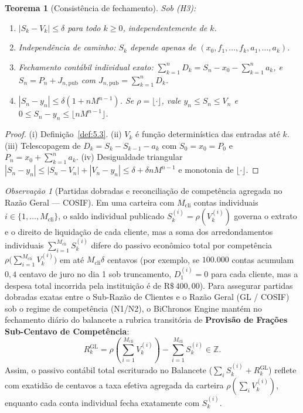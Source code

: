 \documentclass[11pt, a4paper]{article}
\theoremstyle{definition}
\theoremstyle{plain}
\newtheorem{teorema}[definicao]{Teorema}
\theoremstyle{remark}
\newtheorem{observacao}[definicao]{Observação}
\begin{document}
\begin{teorema}[Consistência de fechamento]\label{teo:5.8}
Sob (H3):
\begin{enumerate}[label=(\roman*)]
    \item $|S_k - V_k| \le \delta$ para todo $k \ge 0$, independentemente de $k$.
    \item Independência de caminho: $S_k$ depende apenas de $(x_0, f_1, \dots, f_k, a_1, \dots, a_k)$.
    \item Fechamento contábil individual exato: $\sum_{k=1}^{n} D_k = S_n - x_0 - \sum_{k=1}^{n} a_k$, e $S_n = P_n + J_{n,\text{pub}}$ com $J_{n,\text{pub}} = \sum_{k=1}^n D_k$.
    \item $|S_n - y_n| \le \delta(1 + n M^{n-1})$. Se $\rho = \lfloor \cdot \rfloor$, vale $y_n \le S_n \le V_n$ e $0 \le S_n - y_n \le \lfloor n M^{n-1} \rfloor$.
\end{enumerate}
\end{teorema}
\begin{proof}
(i) Definição~\ref{def:5.3}. (ii) $V_k$ é função determinística das entradas até $k$. (iii) Telescopagem de $D_k = S_k - S_{k-1} - a_k$ com $S_0 = x_0 = P_0$ e $P_n = x_0 + \sum_{k=1}^n a_k$. (iv) Desigualdade triangular $|S_n - y_n| \le |S_n - V_n| + |V_n - y_n| \le \delta + \delta n M^{n-1}$ e monotonia de $\lfloor \cdot \rfloor$.
\end{proof}

\begin{observacao}[Partidas dobradas e reconciliação de competência agregada no Razão Geral --- COSIF]\label{obs:5.9}
Em uma carteira com $M_{\text{cli}}$ contas individuais $i \in \{1, \dots, M_{\text{cli}}\}$, o saldo individual publicado $S_k^{(i)} = \rho(V_k^{(i)})$ governa o extrato e o direito de liquidação de cada cliente, mas a soma dos arredondamentos individuais $\sum_{i=1}^{M_{\text{cli}}} S_k^{(i)}$ difere do passivo econômico total por competência $\rho\big(\sum_{i=1}^{M_{\text{cli}}} V_k^{(i)}\big)$ em até $M_{\text{cli}}\delta$ centavos (por exemplo, se $100.000$ contas acumulam $0{,}4$ centavo de juro no dia 1 sob truncamento, $D_1^{(i)} = 0$ para cada cliente, mas a despesa total incorrida pela instituição é de $\text{R\$}\,400{,}00$). Para assegurar partidas dobradas exatas entre o Sub-Razão de Clientes e o Razão Geral (GL / COSIF) sob o regime de competência (N1/N2), o BiChronos Engine mantém no fechamento diário do balancete a rubrica transitória de \textbf{Provisão de Frações Sub-Centavo de Competência}:
\[
R_k^{\text{GL}} = \rho\left(\sum_{i=1}^{M_{\text{cli}}} V_k^{(i)}\right) - \sum_{i=1}^{M_{\text{cli}}} S_k^{(i)} \in \mathbb{Z}.
\]
Assim, o passivo contábil total escriturado no Balancete ($\sum_i S_k^{(i)} + R_k^{\text{GL}}$) reflete com exatidão de centavos a taxa efetiva agregada da carteira $\rho(\sum_i V_k^{(i)})$, enquanto cada conta individual fecha exatamente com $S_k^{(i)}$.
\end{observacao}
\end{document}
